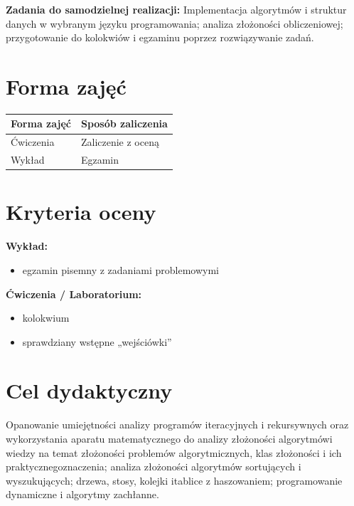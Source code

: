 \documentclass[12pt, a4paper]{article}
\newcommand{\thdrule}{\noalign{\global\setlength{\extrarowheight}{0pt}}}
\newcommand{\thdend}{\noalign{\global\setlength{\extrarowheight}{3pt}}}
\begin{document}
\vspace{4pt}
\noindent\textbf{Zadania do samodzielnej realizacji:} Implementacja algorytmów i struktur danych w wybranym języku programowania; analiza złożoności obliczeniowej; przygotowanie do kolokwiów i egzaminu poprzez rozwiązywanie zadań.

\section{Forma zajęć}

\begin{center}
{\scriptsize
\begin{tabular}{m{5cm}m{8cm}}
\thdrule\toprule
\rowcolor{pjatkRed} {\color{white}\textbf{Forma zajęć}} & {\color{white}\textbf{Sposób zaliczenia}} \\
\midrule\thdend
  \rowcolor{tableRowLight} Ćwiczenia & Zaliczenie z oceną \\
  \rowcolor{tableRowAlt} Wykład & Egzamin \\
\bottomrule
\end{tabular}}
\end{center}

\section{Kryteria oceny}

\textbf{Wykład:}
\begin{itemize}
  \item egzamin pisemny z zadaniami problemowymi
\end{itemize}
\vspace{4pt}
\textbf{Ćwiczenia / Laboratorium:}
\begin{itemize}
  \item kolokwium
  \item sprawdziany wstępne „wejściówki''
\end{itemize}


\section{Cel dydaktyczny}

Opanowanie umiejętności analizy programów iteracyjnych i rekursywnych oraz wykorzystania aparatu matematycznego do analizy złożoności algorytmówi wiedzy na temat złożoności problemów algorytmicznych, klas złożoności i ich praktycznegoznaczenia; analiza złożoności algorytmów sortujących i wyszukujących; drzewa, stosy, kolejki itablice z haszowaniem; programowanie dynamiczne i algorytmy zachłanne.
\end{document}
